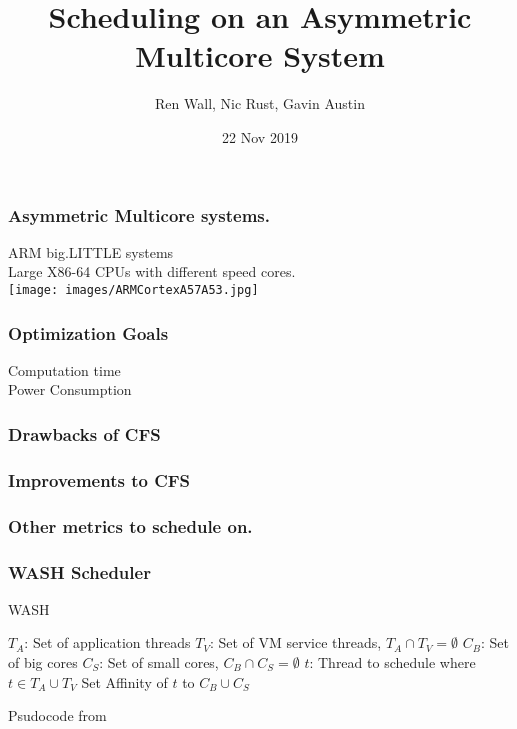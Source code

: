 \documentclass{beamer}
\title{Scheduling on an Asymmetric Multicore System}
\author{Ren Wall, Nic Rust, Gavin Austin}
\institute{}
\date{22 Nov 2019}
\begin{document}
	\frame{\titlepage}
	
	\begin{frame}
		\frametitle{Asymmetric Multicore systems.}
		ARM big.LITTLE systems\\
		Large X86-64 CPUs with different speed cores.\\
		\texttt{[image: images/ARMCortexA57A53.jpg]}
	\end{frame}
	
	\begin{frame}
		\frametitle{Optimization Goals}
		Computation time\\
		Power Consumption\\
	\end{frame}
	
	\begin{frame}
		\frametitle{Drawbacks of CFS}
	\end{frame}
	
	\begin{frame}
		\frametitle{Improvements to CFS}
	\end{frame}
	
	\begin{frame}
		\frametitle{Other metrics to schedule on.}
	\end{frame}
	
	\begin{frame}
		\frametitle{WASH Scheduler}
		\begin{algorithm}[H]
		\caption{WASH}\label{euclid}
		\begin{algorithmic}
				\State $T_A$: Set of application threads
				\State $T_V$: Set of VM service threads, $T_A \cap T_V = \emptyset$
				\State $C_B$: Set of big cores
				\State $C_S$: Set of small cores, $C_B \cap C_S = \emptyset$
				\State $t$: Thread to schedule where $t \in T_A \cup T_V$
					\EndIf
						\State Set Affinity of $t$ to $C_B \cup C_S$
					\EndIf
				\EndIf
			\EndFunction
		\end{algorithmic}
		\end{algorithm}
		Psudocode from \cite{Jibaja:2016:PPA:2854038.2854047}
	\end{frame}
	
	\begin{frame}
		{}
		
	\end{frame}
\end{document}
